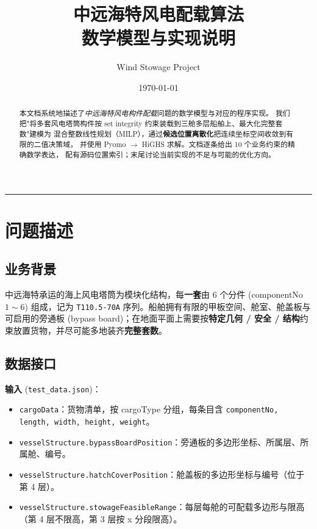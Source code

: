\documentclass[a4paper,11pt]{ctexart}
\title{\textbf{中远海特风电配载算法 \\ 数学模型与实现说明}}
\author{Wind Stowage Project}
\date{\today}
\begin{document}
\maketitle

\begin{abstract}
\noindent
本文档系统地描述了\emph{中远海特风电构件配载}问题的数学模型与对应的程序实现。
我们把"将多套风电塔筒构件按 set integrity 约束装载到三舱多层船舶上、最大化完整套数"建模为
混合整数线性规划（MILP），通过\textbf{候选位置离散化}把连续坐标空间收敛到有限的二值决策域，
并使用 Pyomo $\to$ HiGHS 求解。文档逐条给出 10 个业务约束的精确数学表达，
配有源码位置索引；末尾讨论当前实现的不足与可能的优化方向。
\end{abstract}

\tableofcontents
\bigskip
\hrule
\bigskip

\section{问题描述}

\subsection{业务背景}

中远海特承运的海上风电塔筒为模块化结构，每\textbf{一套}由 6 个分件 (componentNo $1\sim 6$)
组成，记为 \texttt{T110.5-70A} 序列。船舶拥有有限的甲板空间、舱室、舱盖板与可启用的旁通板
(bypass board)；在地面平面上需要按\textbf{特定几何 / 安全 / 结构}约束放置货物，并尽可能多地装齐\textbf{完整套数}。

\subsection{数据接口}

\textbf{输入} (\texttt{test\_data.json})：
\begin{itemize}[leftmargin=2em,itemsep=2pt]
  \item \texttt{cargoData}：货物清单，按 cargoType 分组，每条目含 \texttt{componentNo, length, width, height, weight}。
  \item \texttt{vesselStructure.bypassBoardPosition}：旁通板的多边形坐标、所属层、所属舱、编号。
  \item \texttt{vesselStructure.hatchCoverPosition}：舱盖板的多边形坐标与编号（位于第 4 层）。
  \item \texttt{vesselStructure.stowageFeasibleRange}：每层每舱的可配载多边形与限高（第 4 层不限高，第 3 层按 x 分段限高）。
\end{itemize}
\end{document}
